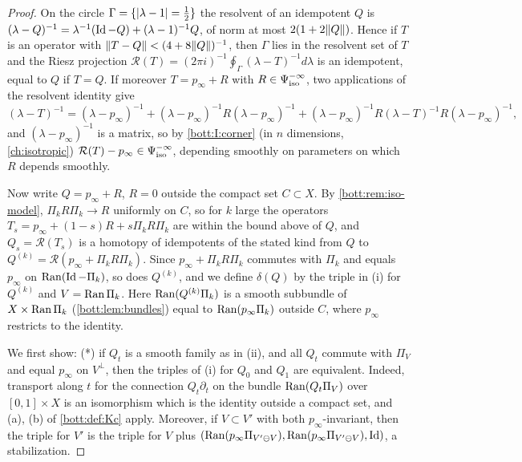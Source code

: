 \begin{proof}
  On the circle $\Gamma=\{\lvert \lambda-1\rvert=\frac12\}$ the resolvent of an idempotent $Q$ is
  $(\lambda-Q)^{-1}=\lambda^{-1}(\operatorname{Id}-Q)+(\lambda-1)^{-1}Q$, of norm at most
  $2(1+2\lVert Q\rVert)$. Hence if $T$ is an operator with $\lVert T-Q\rVert<(4+8\lVert Q\rVert)^{-1}$, then
  $\Gamma$ lies in the resolvent set of $T$ and the Riesz projection
  $\mathcal R(T)=(2\pi i)^{-1}\oint_\Gamma(\lambda-T)^{-1}d\lambda$ is an idempotent, equal to
  $Q$ if $T=Q$. If moreover $T=p_\infty+R$ with $R\in\Psi^{-\infty}_{\mathrm{iso}}$, two applications of
  the resolvent identity give
  \begin{equation*}
    (\lambda-T)^{-1}=(\lambda-p_\infty)^{-1}+(\lambda-p_\infty)^{-1}R(\lambda-p_\infty)^{-1}
    +(\lambda-p_\infty)^{-1}R(\lambda-T)^{-1}R(\lambda-p_\infty)^{-1},
  \end{equation*}
  and $(\lambda-p_\infty)^{-1}$ is a matrix, so by \ref{bott:I:corner} (in $n$ dimensions,
  \cref{ch:isotropic}) $\mathcal R(T)-p_\infty\in\Psi^{-\infty}_{\mathrm{iso}}$, depending smoothly on
  parameters on which $R$ depends smoothly.

  Now write $Q=p_\infty+R$, $R=0$ outside the compact set $C\subset X$. By
  \cref{bott:rem:iso-model}, $\Pi_kR\Pi_k\to R$ uniformly on $C$, so for $k$ large the
  operators $T_s=p_\infty+(1-s)R+s\Pi_kR\Pi_k$ are within the bound above of $Q$, and
  $Q_s=\mathcal R(T_s)$ is a homotopy of idempotents of the stated kind from $Q$ to
  $Q^{(k)}=\mathcal R(p_\infty+\Pi_kR\Pi_k)$. Since $p_\infty+\Pi_kR\Pi_k$ commutes with
  $\Pi_k$ and equals $p_\infty$ on $\operatorname{Ran}(\operatorname{Id}-\Pi_k)$, so does $Q^{(k)}$, and we define
  $\delta(Q)$ by the triple in (i) for $Q^{(k)}$ and $V=\operatorname{Ran}\Pi_k$. Here $\operatorname{Ran}(Q^{(k)}\Pi_k)$ is
  a smooth subbundle of $X\times\operatorname{Ran}\Pi_k$ (\cref{bott:lem:bundles}) equal to
  $\operatorname{Ran}(p_\infty\Pi_k)$ outside $C$, where $p_\infty$ restricts to the identity.

  We first show: (*) if $Q_t$ is a smooth family as in (ii), and all $Q_t$ commute with
  $\Pi_V$ and equal $p_\infty$ on $V^\perp$, then the triples of (i) for $Q_0$ and $Q_1$ are
  equivalent. Indeed, transport along $t$ for the connection $Q_t\partial_t$ on the bundle
  $\operatorname{Ran}(Q_t\Pi_V)$ over $[0,1]\times X$ is an isomorphism which is the identity outside a
  compact set, and (a), (b) of \cref{bott:def:Kc} apply. Moreover, if $V\subset V'$ with
  both $p_\infty$-invariant, then the triple for $V'$ is the triple for $V$ plus
  $(\operatorname{Ran}(p_\infty\Pi_{V'\ominus V}),\operatorname{Ran}(p_\infty\Pi_{V'\ominus V}),\operatorname{Id})$, a stabilization.


\end{proof}
